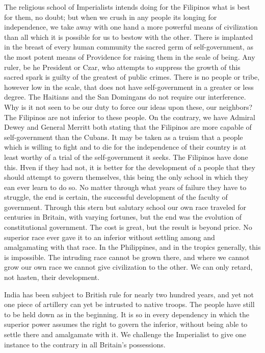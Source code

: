 \documentclass[11pt,openany]{book}
\begin{document}
The religious school of Imperialists intends doing for the Filipinos what is best for them, no doubt; but when we crush in any people its longing for independence, we take away with one hand a more powerful means of civilization than all which it is possible for us to bestow with the other. There is implanted in the breast of every human community the sacred germ of self-government, as the most potent means of Providence for raising them in the seale of being. Any ruler, be he President or Czar, who attempts to suppress the growth of this sacred spark is guilty of the greatest of public crimes. There is no people or tribe, however low in the scale, that does not have self-government in a greater or less degree. The Haitians and the San Domingans do not require our interference. Why is it not seen to be our duty to force our ideas upon these, our neighbors? The Filipinos are not inferior to these people. On the contrary, we have Admiral Dewey and General Merritt both stating that the Filipinos are more capable of self-government than the Cubans. It may be taken as a truism that a people which is willing to fight and to die for the independence of their country is at least worthy of a trial of the self-government it seeks. The Filipinos have done this. Hven if they had not, it is better for the development of a people that they should attempt to govern themselves, this being the only school in which they ean ever learn to do so. No matter through what years of failure they have to struggle, the end is certain, the successful development of the faculty of government. Through this stern but salutary school our own race traveled for centuries in Britain, with varying fortunes, but the end was the evolution of constitutional government. The cost is great, but the result is beyond price. No superior race ever gave it to an inferior without settling among and amalgamating with that race. In the Philippines, and in the tropics generally, this is impossible. The intruding race cannot be grown there, and where we cannot grow our own race we cannot give civilization to the other. We can only retard, not hasten, their development.

India has been subject to British rule for nearly two hundred years, and yet not one piece of artillery can yet be intrusted to native troops. The people have still to be held down as in the beginning. It is so in every dependency in which the superior power assumes the right to govern the inferior, without being able to settle there and amalgamate with it. We challenge the Imperialist to give one instance to the contrary in all Britain's possessions.
\end{document}
